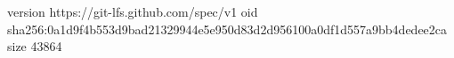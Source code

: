version https://git-lfs.github.com/spec/v1
oid sha256:0a1d9f4b553d9bad21329944e5e950d83d2d956100a0df1d557a9bb4dedee2ca
size 43864
